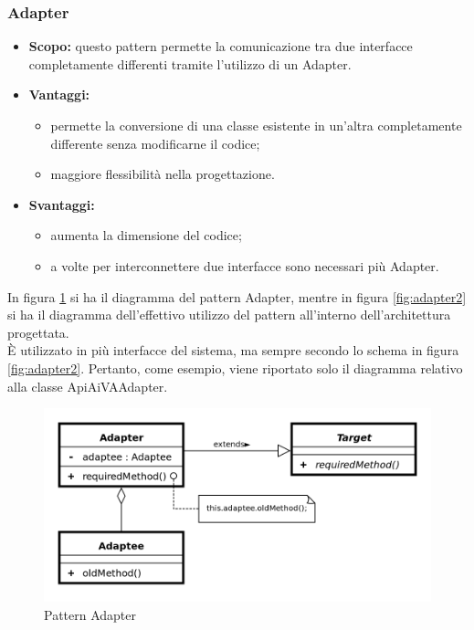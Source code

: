     \subsubsection{Adapter}
      \begin{itemize}
       \item \textbf{Scopo:} questo pattern permette la comunicazione tra due interfacce completamente differenti tramite l'utilizzo di un Adapter.
	\item \textbf{Vantaggi:}
	  \begin{itemize}
	   \item permette la conversione di una classe esistente in un'altra completamente differente senza modificarne il codice;
	   \item maggiore flessibilità nella progettazione.
	  \end{itemize}
	\item \textbf{Svantaggi:}
	  \begin{itemize}
	   \item aumenta la dimensione del codice;
	   \item a volte per interconnettere due interfacce sono necessari più Adapter.
	  \end{itemize}
	\end{itemize}
	In figura \ref{fig:adapter1} si ha il diagramma del pattern Adapter, mentre in figura \ref{fig:adapter2} si ha il diagramma dell'effettivo utilizzo del pattern all'interno dell'architettura progettata.\\
È utilizzato in più interfacce del sistema, ma sempre secondo lo schema in figura \ref{fig:adapter2}. Pertanto, come esempio, viene riportato solo il diagramma relativo alla classe ApiAiVAAdapter.
	\begin{figure}[h]
		\centering
		\includegraphics[width=\textwidth,height=\textheight,keepaspectratio,scale=0.1]{images/adapterpattern.png}
		\caption{Pattern Adapter}\label{fig:adapter1}
	\end{figure}
